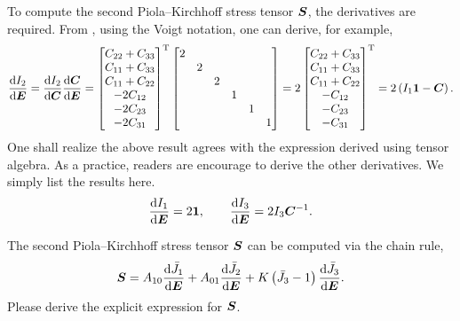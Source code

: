 To compute the second Piola--Kirchhoff stress tensor $\bm{S}$, the derivatives are required.
From , using the Voigt notation, one can derive, for example,
\begin{gather}
    \dfrac{\mathrm{d}I_2}{\mathrm{d}\bm{E}}=\dfrac{\mathrm{d}I_2}{\mathrm{d}\bm{C}}\dfrac{\mathrm{d}\bm{C}}{\mathrm{d}\bm{E}}=\begin{bmatrix}
        C_{22}+C_{33} \\
        C_{11}+C_{33} \\
        C_{11}+C_{22} \\
        -2C_{12}      \\
        -2C_{23}      \\
        -2C_{31}
    \end{bmatrix}^{\mathrm{T}}\begin{bmatrix}
        2 &   &   &   &   &   \\
          & 2 &   &   &   &   \\
          &   & 2 &   &   &   \\
          &   &   & 1 &   &   \\
          &   &   &   & 1 &   \\
          &   &   &   &   & 1 \\
    \end{bmatrix}=2\begin{bmatrix}
        C_{22}+C_{33} \\
        C_{11}+C_{33} \\
        C_{11}+C_{22} \\
        -C_{12}       \\
        -C_{23}       \\
        -C_{31}
    \end{bmatrix}^{\mathrm{T}}=2\left(I_1\bm{1}-\bm{C}\right).
\end{gather}
One shall realize the above result agrees with the expression derived using tensor algebra.
As a practice, readers are encourage to derive the other derivatives.
We simply list the results here.
\begin{gather}
    \dfrac{\mathrm{d}I_1}{\mathrm{d}\bm{E}}=2\bm{1},\qquad
    \dfrac{\mathrm{d}I_3}{\mathrm{d}\bm{E}}=2I_3\bm{C}^{-1}.
\end{gather}

The second Piola--Kirchhoff stress tensor $\bm{S}$ can be computed via the chain rule,
\begin{gather}
    \bm{S}=A_{10}\dfrac{\mathrm{d}\bar{J_1}}{\mathrm{d}\bm{E}}+A_{01}\dfrac{\mathrm{d}\bar{J_2}}{\mathrm{d}\bm{E}}+K\left(\bar{J_3}-1\right)\dfrac{\mathrm{d}\bar{J_3}}{\mathrm{d}\bm{E}}.
\end{gather}
Please derive the explicit expression for $\bm{S}$.

